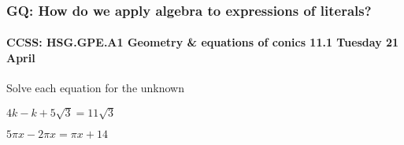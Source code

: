 \documentclass{beamer}
\begin{document}
\frame
{
  \frametitle{GQ: How do we apply algebra to expressions of literals?}
  \framesubtitle{CCSS: HSG.GPE.A1 Geometry \& equations of conics \hfill \alert{11.1 Tuesday 21 April}}

  Solve each equation for the unknown
  
  \begin{enumerate}%
    \begin{multicols}{2}
      \item $4k-k+5\sqrt{3}=11\sqrt{3}$
      \item $5\pi x-2 \pi x= \pi x +14$
    \end{multicols}
    \end{enumerate} \vspace{7cm}
}
\end{document}
